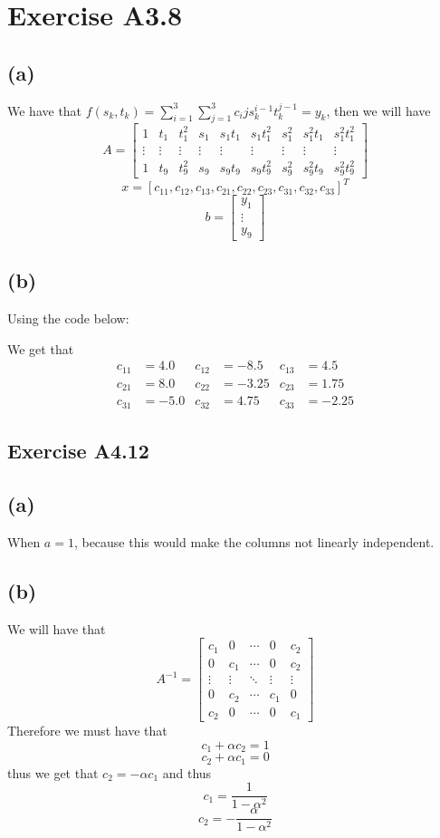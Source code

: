 \section*{Exercise A3.8}
\subsection*{(a)}
We have that $f(s_k,t_k)=\sum_{i=1}^{3}\sum_{j=1}^{3}c_ijs_k^{i-1}t_k^{j-1}=y_k$, then we will have
$$A=\begin{bmatrix}
    1&t_1&t_1^2&s_1&s_1t_1&s_1t_1^2&s_1^2&s_1^2t_1&s_1^2t_1^2\\
    \vdots & \vdots & \vdots & \vdots & \vdots & \vdots & \vdots & \vdots & \vdots\\
    1&t_9&t_9^2&s_9&s_9t_9&s_9t_9^2&s_9^2&s_9^2t_9&s_9^2t_9^2
\end{bmatrix}$$
$$x=[c_11,c_12,c_13,c_21,c_22,c_23,c_31,c_32,c_33]^T$$
$$b=\begin{bmatrix}
    y_1\\
    \vdots\\
    y_9
\end{bmatrix}$$
\subsection*{(b)}
Using the code below:

We get that 
$$\begin{matrix}
    c_{11}&=4.0&c_{12}&=-8.5&c_{13}&=4.5\\
    c_{21}&=8.0&c_{22}&=-3.25&c_{23}&=1.75\\
    c_{31}&=-5.0&c_{32}&=4.75&c_{33}&=-2.25
\end{matrix}$$

\subsection*{Exercise A4.12}
\subsection*{(a)}
When $a=1$, because this would make the columns not linearly independent.
\subsection*{(b)}
We will have that 
$$A^{-1}=\begin{bmatrix}
    c_1 & 0 & \cdots & 0 & c_2\\
    0 & c_1 & \cdots & 0 & c_2\\
    \vdots & \vdots & \ddots & \vdots & \vdots\\
    0 & c_2 & \cdots & c_1 & 0\\
    c_2 & 0 & \cdots & 0 & c_1
\end{bmatrix}$$
Therefore we must have that 
$$c_1+\alpha c_2=1$$
$$c_2+\alpha c_1=0$$
thus we get that $c_2=-\alpha c_1$ and thus
$$c_1=\frac{1}{1-\alpha^2}$$
$$c_2=-\frac{\alpha}{1-\alpha^2}$$

